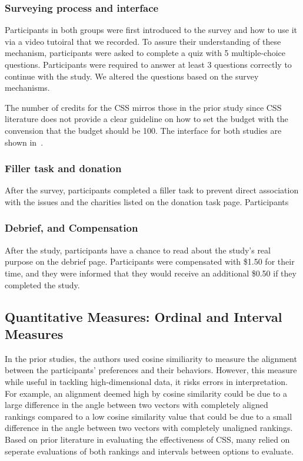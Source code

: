 \subsubsection{Surveying process and interface}
Participants in both groups were first introduced to the survey and how to use it via a video tutoiral that we recorded. To assure their understanding of these mechanism, participants were asked to complete a quiz with 5 multiple-choice questions. Participants were required to answer at least 3 questions correctly to continue with the study. We altered the questions based on the survey mechanisms.

The number of credits for the CSS mirros those in the prior study since CSS literature does not provide a clear guideline on how to set the budget with the convension that the budget should be 100. The interface for both studies are shown in~.

\subsubsection{Filler task and donation}
After the survey, participants completed a filler task to prevent direct association with the issues and the charities listed on the donation task page. Participants 

\subsubsection{Debrief, and Compensation}
After the study, participants have a chance to read about the study's real purpose on the debrief page. Participants were compensated with \$1.50 for their time, and they were informed that they would receive an additional \$0.50 if they completed the study.

\subsection{Quantitative Measures: Ordinal and Interval Measures}
\label{sec:quantitative_measures}


In the prior studies, the authors used cosine similiarity to measure the alignment between the participants' preferences and their behaviors. However, this measure while useful in tackling high-dimensional data, it risks errors in interpretation. For example, an alignment deemed high by cosine similarity could be due to a large difference in the angle between two vectors with completely aligned rankings compared to a low cosine similarity value that could be due to a small difference in the angle between two vectors with completely unaligned rankings. Based on prior literature in evaluating the effectiveness of CSS, many relied on seperate evaluations of both rankings and intervals between options to evaluate.

